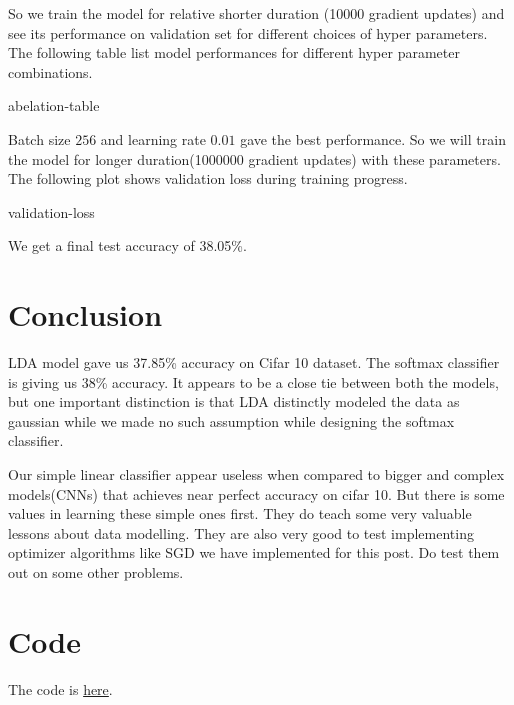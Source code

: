 \documentclass[10pt]{article}
\begin{document}
So we train the model for relative shorter duration (10000 gradient updates) and see its performance on validation set for different choices of hyper parameters. The following table list model performances for different hyper parameter combinations.

\begin{center}
  {abelation-table} %
\end{center}

Batch size $256$ and learning rate $0.01$ gave the best performance. So we will train the model for longer duration(1000000 gradient updates) with these parameters. The following plot shows validation loss during training progress.

\begin{center}
  {validation-loss} %
\end{center}


We get a final test accuracy of 38.05\%.

\section{Conclusion}
LDA model gave us 37.85\% accuracy on Cifar 10 dataset. The softmax classifier is giving us 38\% accuracy. It appears to be a close tie between both the models, but one important distinction is that LDA distinctly modeled the data as gaussian while we made no such assumption while designing the softmax classifier. 

Our simple linear classifier appear useless when compared to bigger and complex models(CNNs) that achieves near perfect accuracy on cifar 10. But there is some values in learning these simple ones first. They do teach some very valuable lessons about data modelling. They are also very good to test implementing optimizer algorithms like SGD we have implemented for this post. Do test them out on some other problems.


\section{Code}
The code is \href{https://github.com/nithishdivakar/blog-post-codes/tree/master/softmax-classifiers}{here}.
\end{document}
